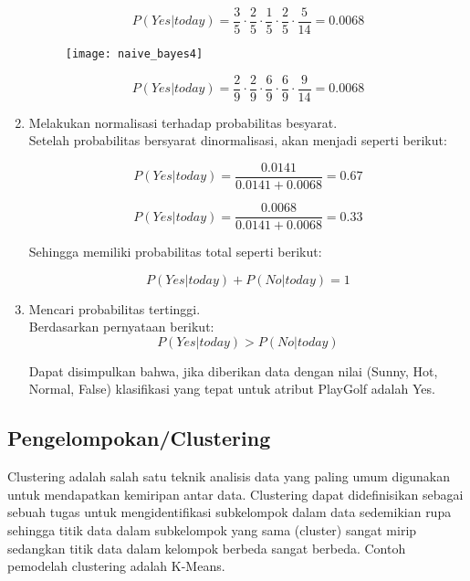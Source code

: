 \begin{enumerate}
\begin{equation}
P(Yes|today) = \frac{3}{5} \cdot \frac{2}{5} \cdot \frac{1}{5} \cdot \frac{2}{5} \cdot \frac{5}{14} = 0.0068
\end{equation}

\begin{figure}[H]
	\centering
	\texttt{[image: naive\_bayes4]}
	\label{fig:naive_bayes4}
\end{figure}

\begin{equation}
P(Yes|today) = \frac{2}{9} \cdot \frac{2}{9} \cdot \frac{6}{9} \cdot \frac{6}{9} \cdot \frac{9}{14} = 0.0068
\end{equation}

\item Melakukan normalisasi terhadap probabilitas besyarat.\\

Setelah probabilitas bersyarat dinormalisasi, akan menjadi seperti berikut:

\begin{equation}
P(Yes|today) = \frac{0.0141}{0.0141 + 0.0068} = 0.67
\end{equation}

\begin{equation}
P(Yes|today) = \frac{0.0068}{0.0141 + 0.0068} = 0.33
\end{equation}

Sehingga memiliki probabilitas total seperti berikut:

\begin{equation}
P(Yes|today) + P(No|today) = 1
\end{equation}

\item Mencari probabilitas tertinggi.\\

Berdasarkan pernyataan berikut:
\begin{equation}
P(Yes|today) > P(No|today)
\end{equation}

\noindent Dapat disimpulkan bahwa, jika diberikan data dengan nilai (Sunny, Hot, Normal, False) klasifikasi yang tepat untuk atribut PlayGolf adalah Yes.



\end{enumerate}

\newpage
\subsection{Pengelompokan/Clustering} 
Clustering adalah salah satu teknik analisis data yang paling umum digunakan untuk mendapatkan kemiripan antar data. Clustering dapat didefinisikan sebagai sebuah tugas untuk mengidentifikasi subkelompok dalam data sedemikian rupa sehingga titik data dalam subkelompok yang sama (cluster) sangat mirip sedangkan titik data dalam kelompok berbeda sangat berbeda. Contoh pemodelah clustering adalah K-Means.

